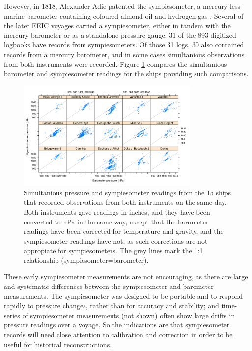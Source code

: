\documentclass[CP]{copernicus}
\begin{document}
 However, in 1818, Alexander Adie patented the sympiesometer, a mercury-less marine barometer containing coloured almond oil and hydrogen gas \citep{middleton64}. Several of the later EEIC voyages carried a sympiesometer, either in tandem with the mercury barometer or as a standalone pressure gauge: 31 of the 893 digitized logbooks have records from sympiesometers. Of those 31 logs, 30 also contained records from a mercury barometer, and in some cases simultanious observations from both instruments were recorded. Figure \ref{ps1} compares the simultanious barometer and sympiesometer readings for the ships providing such comparisons. 
\begin{figure}[!hbp]
\begin{center}
\includegraphics[angle=0, width=0.8\textwidth]{./../../../analysis/sympiesometer/sym_v_pre_censored.pdf}
\caption{Simultanious pressure and sympiesometer readings from the 15 ships that recorded observations from both instruments on the same day. Both instruments gave readings in inches, and they have been converted to hPa in the same way, except that the barometer readings have been corrected for temperature and gravity, and the sympiesometer readings have not, as such corrections are not appropiate for sympiesometers. The grey lines mark the 1:1 relationship (sympiesometer=barometer).}
\label{ps1}
\end{center}
\end{figure}

These early sympiesometer measurements are not encouraging, as there are large and systematic differences between the sympiesometer and barometer measurements. The sympiesometer was designed to be portable and to respond rapidly to pressure changes, rather than for accuracy and stability; and time-series of sympiesometer measurements (not shown) often show large drifts in pressure readings over a voyage. So the indications are that sympiesometer records will need close attention to calibration and correction in order to be useful for historical reconstructions.
\end{document}
